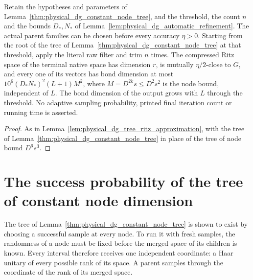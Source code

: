 \begin{lemma}
    \label{lem:physical_dg_constant_node_tree_ritz}
    \leanok
    Retain the hypotheses and parameters of
    Lemma~\ref{thm:physical_dg_constant_node_tree}, and the threshold, the
    count $n$ and the bounds $D_*,N_*$ of
    Lemma~\ref{lem:physical_dg_automatic_refinement}. The actual parent
    families can be chosen before every accuracy $\eta>0$. Starting from the
    root of the tree of Lemma~\ref{thm:physical_dg_constant_node_tree} at
    that threshold, apply the literal raw filter and trim $n$ times. The
    compressed Ritz space of the terminal native space has dimension $r$, is
    mutually $\eta/2$-close to $G$, and every one of its vectors has bond
    dimension at most $10^6(D_*N_*)^2(L+1)M^2$, where $M=D^{2k}s\le D^2s^2$
    is the node bound, independent of $L$. The bond dimension of the output
    grows with $L$ through the threshold. No adaptive sampling probability,
    printed final iteration count or running time is asserted.
\end{lemma}
\begin{proof}\leanok
    As in Lemma~\ref{lem:physical_dg_tree_ritz_approximation}, with the tree
    of Lemma~\ref{thm:physical_dg_constant_node_tree} in place of the tree
    of node bound $D^6s^3$.
\end{proof}

\section{The success probability of the tree of constant node dimension}

The tree of Lemma~\ref{thm:physical_dg_constant_node_tree} is shown to exist
by choosing a successful sample at every node. To run it with fresh samples,
the randomness of a node must be fixed before the merged space of its
children is known. Every interval therefore receives one independent
coordinate: a Haar unitary of every possible rank of its space. A parent
samples through the coordinate of the rank of its merged space.

